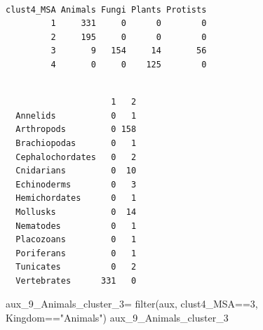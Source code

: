 \documentclass[
  letterpaper,
  DIV=11,
  numbers=noendperiod]{scrreprt}
\newenvironment{Shaded}{}{}
\newcommand{\DecValTok}[1]{\textcolor[rgb]{0.82,0.60,0.40}{#1}}
\newcommand{\FunctionTok}[1]{\textcolor[rgb]{0.38,0.69,0.94}{#1}}
\newcommand{\NormalTok}[1]{\textcolor[rgb]{0.67,0.70,0.75}{#1}}
\newcommand{\OtherTok}[1]{\textcolor[rgb]{0.15,0.68,0.38}{#1}}
\newcommand{\SpecialCharTok}[1]{\textcolor[rgb]{0.34,0.71,0.76}{#1}}
\newcommand{\StringTok}[1]{\textcolor[rgb]{0.60,0.76,0.47}{#1}}
\begin{document}
\begin{Shaded}
\end{Shaded}

\begin{verbatim}
          
clust4_MSA Animals Fungi Plants Protists
         1     331     0      0        0
         2     195     0      0        0
         3       9   154     14       56
         4       0     0    125        0
\end{verbatim}

\begin{Shaded}
\end{Shaded}

\begin{verbatim}
                  
                     1   2
  Annelids           0   1
  Arthropods         0 158
  Brachiopodas       0   1
  Cephalochordates   0   2
  Cnidarians         0  10
  Echinoderms        0   3
  Hemichordates      0   1
  Mollusks           0  14
  Nematodes          0   1
  Placozoans         0   1
  Poriferans         0   1
  Tunicates          0   2
  Vertebrates      331   0
\end{verbatim}

\begin{Shaded}
\begin{Highlighting}[]
\NormalTok{aux\_9\_Animals\_cluster\_3}\OtherTok{=} \FunctionTok{filter}\NormalTok{(aux,}
\NormalTok{                                clust4\_MSA}\SpecialCharTok{==}\DecValTok{3}\NormalTok{,}
\NormalTok{                                Kingdom}\SpecialCharTok{==}\StringTok{"Animals"}\NormalTok{)}
\NormalTok{aux\_9\_Animals\_cluster\_3}
\end{Highlighting}
\end{Shaded}
\end{document}
